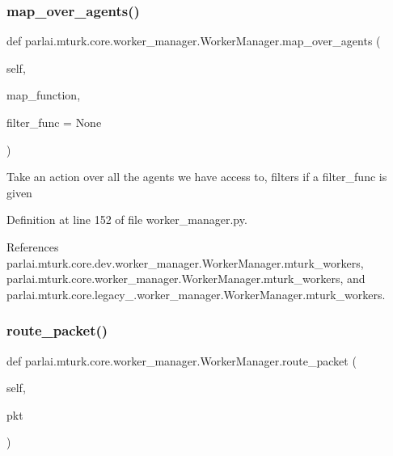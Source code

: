\subsubsection{\texorpdfstring{map\+\_\+over\+\_\+agents()}{map\_over\_agents()}}
{\footnotesize\ttfamily def parlai.\+mturk.\+core.\+worker\+\_\+manager.\+Worker\+Manager.\+map\+\_\+over\+\_\+agents (\begin{DoxyParamCaption}\item[{}]{self,  }\item[{}]{map\+\_\+function,  }\item[{}]{filter\+\_\+func = {\ttfamily None} }\end{DoxyParamCaption})}

\begin{DoxyVerb}Take an action over all the agents we have access to, filters if
a filter_func is given\end{DoxyVerb}
 

Definition at line 152 of file worker\+\_\+manager.\+py.



References parlai.\+mturk.\+core.\+dev.\+worker\+\_\+manager.\+Worker\+Manager.\+mturk\+\_\+workers, parlai.\+mturk.\+core.\+worker\+\_\+manager.\+Worker\+Manager.\+mturk\+\_\+workers, and parlai.\+mturk.\+core.\+legacy\+\_.\+worker\+\_\+manager.\+Worker\+Manager.\+mturk\+\_\+workers.

\mbox{\label{classparlai_1_1mturk_1_1core_1_1worker__manager_1_1WorkerManager_a829bf9d74d9afb0277c11347745ac6db}} 
\subsubsection{\texorpdfstring{route\+\_\+packet()}{route\_packet()}}
{\footnotesize\ttfamily def parlai.\+mturk.\+core.\+worker\+\_\+manager.\+Worker\+Manager.\+route\+\_\+packet (\begin{DoxyParamCaption}\item[{}]{self,  }\item[{}]{pkt }\end{DoxyParamCaption})}

